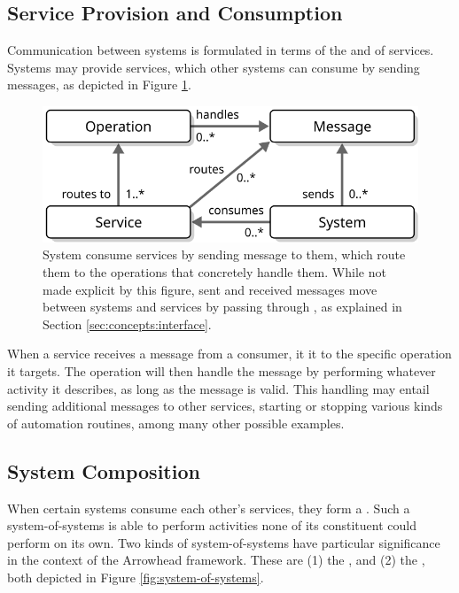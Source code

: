   \vspace*{-3mm}

\subsection{Service Provision and Consumption}

Communication between systems is formulated in terms of the  and  of services.
Systems may provide services, which other systems can consume by sending messages, as depicted in Figure \ref{fig:service-consumption}.

\begin{figure}[ht!]
  \centering
  \includegraphics[scale=0.9]{figures/service-consumption}
  \caption{
    System consume services by sending message to them, which route them to the operations that concretely handle them.
    While not made explicit by this figure, sent and received messages move between systems and services by passing through , as explained in Section \ref{sec:concepts:interface}.
  }
  \label{fig:service-consumption}
\end{figure}

When a service receives a message from a consumer, it  it to the specific operation it targets.
The operation will then handle the message by performing whatever activity it describes, as long as the message is valid.
This handling may entail sending additional messages to other services, starting or stopping various kinds of automation routines, among many other possible examples.

\subsection{System Composition}

When certain systems consume each other's services, they form a .
Such a system-of-systems is able to perform activities none of its constituent  could perform on its own.
Two kinds of system-of-systems have particular significance in the context of the Arrowhead framework.
These are (1) the , and (2) the , both depicted in Figure \ref{fig:system-of-systems}.

